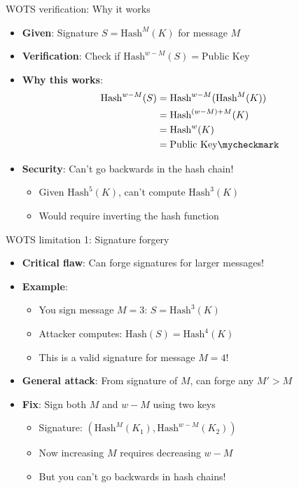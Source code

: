 \documentclass[aspectratio=169, lualatex, handout]{beamer}
\begin{document}
\begin{frame}{WOTS verification: Why it works}
	\begin{itemize}
		\item \textbf{Given}: Signature $S = \text{Hash}^M(K)$ for message $M$
		\item \textbf{Verification}: Check if $\text{Hash}^{w-M}(S) = \text{Public Key}$
		\item \textbf{Why this works}:
		      \begin{align*}
			      \text{Hash}^{w-M}(S) & = \text{Hash}^{w-M}(\text{Hash}^M(K)) \\
			                           & = \text{Hash}^{(w-M)+M}(K)            \\
			                           & = \text{Hash}^w(K)                    \\
			                           & = \text{Public Key} \mycheckmark
		      \end{align*}
		\item \textbf{Security}: Can't go backwards in the hash chain!
		      \begin{itemize}
			      \item Given $\text{Hash}^5(K)$, can't compute $\text{Hash}^3(K)$
			      \item Would require inverting the hash function
		      \end{itemize}
	\end{itemize}
\end{frame}

\begin{frame}{WOTS limitation 1: Signature forgery}
	\begin{itemize}
		\item \textbf{Critical flaw}: Can forge signatures for larger messages!
		\item \textbf{Example}:
		      \begin{itemize}
			      \item You sign message $M = 3$: $S = \text{Hash}^3(K)$
			      \item Attacker computes: $\text{Hash}(S) = \text{Hash}^4(K)$
			      \item This is a valid signature for message $M = 4$!
		      \end{itemize}
		\item \textbf{General attack}: From signature of $M$, can forge any $M' > M$
		\item \textbf{Fix}: Sign both $M$ and $w-M$ using two keys
		      \begin{itemize}
			      \item Signature: $(\text{Hash}^M(K_1), \text{Hash}^{w-M}(K_2))$
			      \item Now increasing $M$ requires decreasing $w-M$
			      \item But you can't go backwards in hash chains!
		      \end{itemize}
	\end{itemize}
\end{frame}
\end{document}
